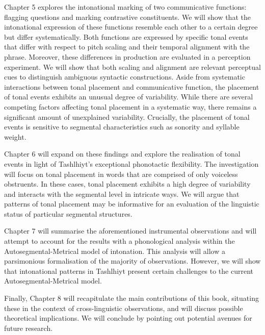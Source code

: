 Chapter 5 explores the intonational marking of two communicative functions: flagging questions and marking contrastive constituents. We will show that the intonational expression of these functions resemble each other to a certain degree but differ systematically. Both functions are expressed by specific tonal events that differ with respect to pitch scaling and their temporal alignment with the phrase. Moreover, these differences in production are evaluated in a perception experiment. We will show that both scaling and alignment are relevant perceptual cues to distinguish ambiguous syntactic constructions. Aside from systematic interactions between tonal placement and communicative function, the placement of tonal events exhibits an unusual degree of variability. While there are several competing factors affecting tonal placement in a systematic way, there remains a significant amount of unexplained variability. Crucially, the placement of tonal events is sensitive to segmental characteristics such as sonority and syllable weight.

Chapter 6 will expand on these findings and explore the realisation of tonal events in light of Tashlhiyt’s exceptional phonotactic flexibility. The investigation will focus on tonal placement in words that are comprised of only voiceless obstruents. In these cases, tonal placement exhibits a high degree of variability and interacts with the segmental level in intricate ways. We will argue that patterns of tonal placement may be informative for an evaluation of the linguistic status of particular segmental structures.

Chapter 7 will summarise the aforementioned instrumental observations and will attempt to account for the results with a phonological analysis within the Autosegmental-Metrical model of intonation. This analysis will allow a parsimonious formalisation of the majority of observations. However, we will show that intonational patterns in Tashlhiyt present certain challenges to the current Autosegmental-Metrical model.

Finally, Chapter 8 will recapitulate the main contributions of this book, situating these in the context of cross-linguistic observations, and will discuss possible theoretical implications. We will conclude by pointing out potential avenues for future research.

